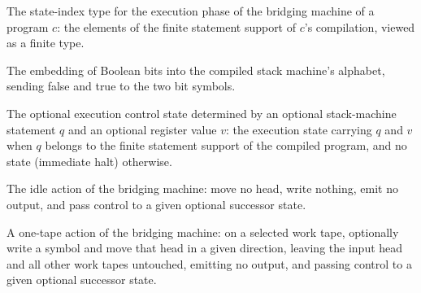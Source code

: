 \begin{definition}
\label{Turing.BridgeQ}
\leanok
{}
The state-index type for the execution phase of the bridging machine of a program
$c$: the elements of the finite statement support of $c$'s compilation, viewed as a
finite type.
\end{definition}

\begin{definition}
\label{Turing.bridgeBit}
\leanok
The embedding of Boolean bits into the compiled stack machine's alphabet, sending
false and true to the two bit symbols.
\end{definition}

\begin{definition}
\label{Turing.bridgeExec}
\leanok
{}
The optional execution control state determined by an optional stack-machine
statement $q$ and an optional register value $v$: the execution state carrying $q$
and $v$ when $q$ belongs to the finite statement support of the compiled program,
and no state (immediate halt) otherwise.
\end{definition}

\begin{definition}
\label{Turing.bridgeIdle}
\leanok
{}
The idle action of the bridging machine: move no head, write nothing, emit no
output, and pass control to a given optional successor state.
\end{definition}

\begin{definition}
\label{Turing.bridgeOne}
\leanok
{}
A one-tape action of the bridging machine: on a selected work tape, optionally write
a symbol and move that head in a given direction, leaving the input head and all
other work tapes untouched, emitting no output, and passing control to a given
optional successor state.
\end{definition}

